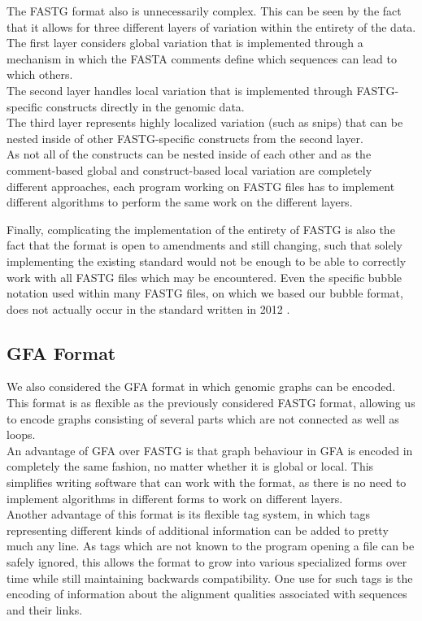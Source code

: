 \documentclass[a4paper,12pt,twoside,BCOR=10mm]{scrbook}
\begin{document}
The FASTG format also is unnecessarily complex. This can be seen by the fact that 
it allows for three different layers of variation within the entirety of the data. \\
The first layer considers global variation that is implemented through a mechanism in which the 
FASTA comments define which sequences can lead to which others. \\
The second layer handles local variation that is implemented through FASTG-specific constructs 
directly in the genomic data. \\
The third layer represents highly localized variation (such as snips) that can be nested 
inside of other FASTG-specific constructs from the second layer. \\
As not all of the constructs can be nested inside of each other 
and as the comment-based global and construct-based local 
variation are completely different approaches, each program working on FASTG files 
has to implement different algorithms to perform the same work on the different layers.

Finally, complicating the implementation of the entirety of FASTG 
is also the fact that the format is open to amendments and still changing, 
such that solely implementing the existing standard would not be enough 
to be able to correctly work with all FASTG files which may be encountered. 
Even the specific bubble notation used within many FASTG files, 
on which we based our bubble format, 
does not actually occur in the standard written in 2012 \citep{specGFA1,specFASTG}.

\subsection{GFA Format}

We also considered the GFA format in which genomic graphs can be encoded. 
This format is as flexible as the previously considered FASTG format, allowing us to encode graphs consisting of 
several parts which are not connected as well as loops. \\
An advantage of GFA over FASTG is that 
graph behaviour in GFA is encoded in completely the same fashion, no matter whether it is global 
or local. This simplifies writing software that can work with the format, 
as there is no need to implement algorithms in different forms to work on 
different layers. \\
Another advantage of this format is its flexible tag system, in which tags representing different kinds of 
additional information can be added to pretty much any line. As tags which are not known to the program 
opening a file can be safely ignored, this allows the format to grow into various specialized forms over 
time while still maintaining backwards compatibility. 
One use for such tags is the encoding of information about the alignment qualities associated with sequences and their links.
\end{document}
